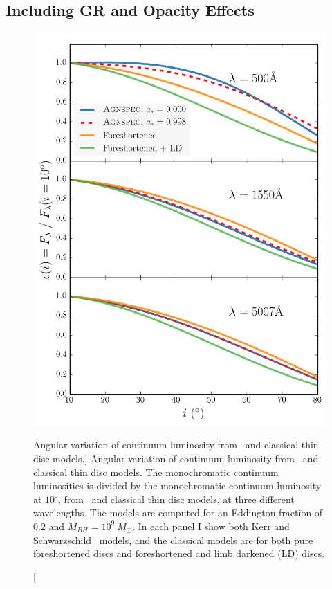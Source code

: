 \subsection{Including GR and Opacity Effects}

\begin{figure}
\centering
\includegraphics[width=1.0\textwidth]{figures/ewpaper/agnspec.png}
\caption
[Angular variation of continuum luminosity from \agn\ and classical thin disc models.]
{
Angular variation of continuum luminosity from \agn\ and classical thin disc models.
The monochromatic continuum luminosities is divided by the monochromatic continuum luminosity
at $10^\circ$, from \agn\ and classical thin disc models, at three different wavelengths.
The models are computed for an Eddington fraction of $0.2$ and $M_{BH}=10^9~M_\odot$. 
In each panel I show both Kerr and Schwarzschild \agn\ models, and the classical models are
for both pure foreshortened discs and foreshortened and limb darkened (LD) discs.
}
\label{fig:agnspec_disc}
\end{figure} 


